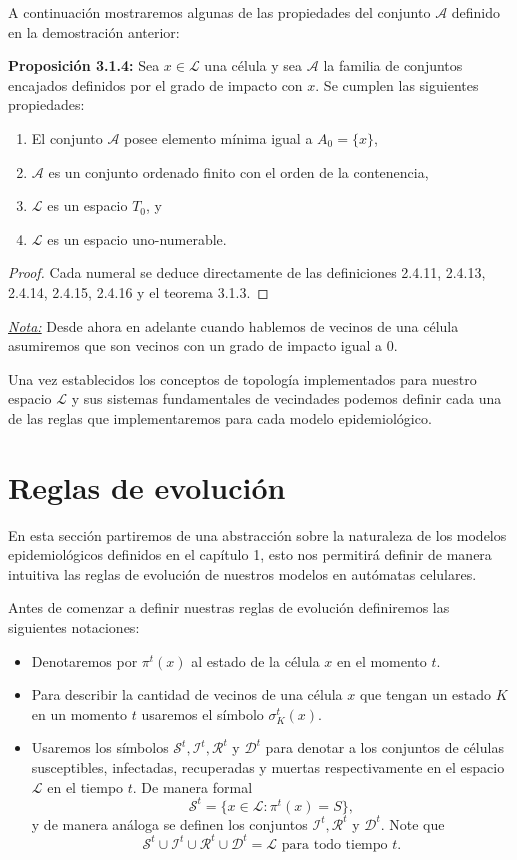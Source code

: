 A continuación mostraremos algunas de las propiedades del conjunto $\mathcal{A}$ definido en la demostración anterior:

\textbf{Proposición 3.1.4:} Sea $x\in\mathcal{L}$ una célula y sea $\mathcal{A}$ la familia de conjuntos encajados definidos por el grado de impacto con $x$. Se cumplen las siguientes propiedades:

\begin{enumerate}
    \item El conjunto $\mathcal{A}$ posee elemento mínima igual a $A_0=\{x\}$,
    \item $\mathcal{A}$ es un conjunto ordenado finito con el orden de la contenencia,
    \item $\mathcal{L}$ es un espacio $T_0$, y
    \item $\mathcal{L}$ es un espacio uno-numerable.
\end{enumerate}

\begin{proof}
Cada numeral se deduce directamente de las definiciones 2.4.11, 2.4.13, 2.4.14, 2.4.15, 2.4.16 y el teorema 3.1.3.
\end{proof}

\underline{\textit{Nota:}} Desde ahora en adelante cuando hablemos de vecinos de una célula asumiremos que son vecinos con un grado de impacto igual a 0.

Una vez establecidos los conceptos de topología implementados para nuestro espacio $\mathcal{L}$ y sus sistemas fundamentales de vecindades podemos definir cada una de las reglas que implementaremos para cada modelo epidemiológico.

\section{Reglas de evolución}

En esta sección partiremos de una abstracción sobre la naturaleza de los modelos epidemiológicos definidos en el capítulo 1, esto nos permitirá definir de manera intuitiva las reglas de evolución de nuestros modelos en autómatas celulares.

Antes de comenzar a definir nuestras reglas de evolución definiremos las siguientes notaciones:
\begin{itemize}
    \item Denotaremos por $\pi^t(x)$ al estado de la célula $x$ en el momento $t$.
    \item Para describir la cantidad de vecinos de una célula $x$ que tengan un estado $K$ en un momento $t$ usaremos el símbolo $\sigma_K^t(x)$.
    \item Usaremos los símbolos $\mathcal{S}^t,\mathcal{I}^t,\mathcal{R}^t$ y $\mathcal{D}^t$ para denotar a los conjuntos de células susceptibles, infectadas, recuperadas y muertas respectivamente en el espacio $\mathcal{L}$ en el tiempo $t$. De manera formal
    $$\mathcal{S}^t=\{x\in\mathcal{L}:\pi^t(x)=S\},$$
    y de manera análoga se definen los conjuntos $\mathcal{I}^t,\mathcal{R}^t$ y $\mathcal{D}^t$. Note que $$\mathcal{S}^t\cup\mathcal{I}^t\cup\mathcal{R}^t\cup\mathcal{D}^t=\mathcal{L}\text{ para todo tiempo }t.$$
\end{itemize}

